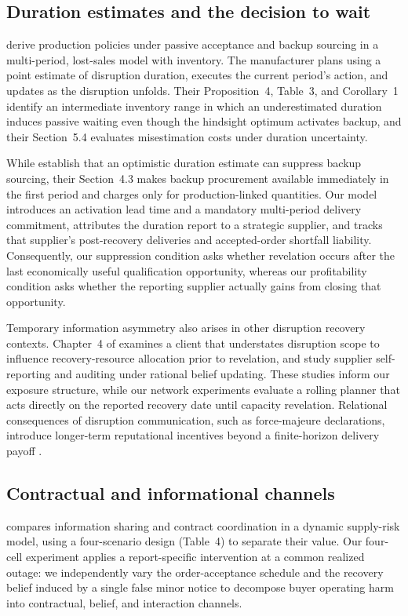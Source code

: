 \documentclass[preprint,11pt,authoryear]{elsarticle}
\begin{document}
\subsection{Duration estimates and the decision to wait}
\citet{jin2026} derive production policies under passive acceptance and backup sourcing in a multi-period, lost-sales model with inventory. The manufacturer plans using a point estimate of disruption duration, executes the current period's action, and updates as the disruption unfolds. Their Proposition~4, Table~3, and Corollary~1 identify an intermediate inventory range in which an underestimated duration induces passive waiting even though the hindsight optimum activates backup, and their Section~5.4 evaluates misestimation costs under duration uncertainty.

While \citet{jin2026} establish that an optimistic duration estimate can suppress backup sourcing, their Section~4.3 makes backup procurement available immediately in the first period and charges only for production-linked quantities. Our model introduces an activation lead time and a mandatory multi-period delivery commitment, attributes the duration report to a strategic supplier, and tracks that supplier's post-recovery deliveries and accepted-order shortfall liability. Consequently, our suppression condition asks whether revelation occurs after the last economically useful qualification opportunity, whereas our profitability condition asks whether the reporting supplier actually gains from closing that opportunity.

Temporary information asymmetry also arises in other disruption recovery contexts. Chapter~4 of \citet{jansen2016} examines a client that understates disruption scope to influence recovery-resource allocation prior to revelation, and \citet{luTomlin2022} study supplier self-reporting and auditing under rational belief updating. These studies inform our exposure structure, while our network experiments evaluate a rolling planner that acts directly on the reported recovery date until capacity revelation. Relational consequences of disruption communication, such as force-majeure declarations, introduce longer-term reputational incentives beyond a finite-horizon delivery payoff \citep{burkhartBode2025}.

\subsection{Contractual and informational channels}
\citet{gaoCoordination2015} compares information sharing and contract coordination in a dynamic supply-risk model, using a four-scenario design (Table~4) to separate their value. Our four-cell experiment applies a report-specific intervention at a common realized outage: we independently vary the order-acceptance schedule and the recovery belief induced by a single false minor notice to decompose buyer operating harm into contractual, belief, and interaction channels.
\end{document}
